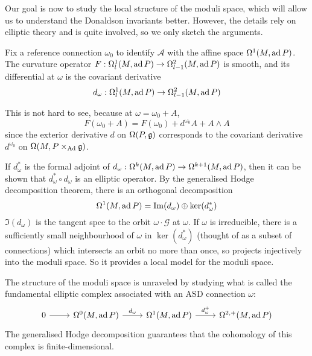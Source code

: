 \begin{comment}
The space of gauge connections $\mathcal{A}$ on a principal bundle is the
universal bundle for the group of gauge transformations $\mathcal{G}$. (ch 15
Cordes)
\end{comment}

Our goal is now to study the local structure of the moduli space, which will
allow us to understand the Donaldson invariants better. However, the details
rely on elliptic theory and is quite involved, so we only sketch the arguments.
\begin{prop}
Fix a reference connection $\omega_0$ to identify
$\mathcal{A}$ with the affine space $\Omega^1(M,\operatorname{ad} P)$. 
The curvature operator $F:\Omega^1_{l}(M,\operatorname{ad} P) \to \Omega^2_{l-1}(M,\operatorname{ad} P)$ is smooth, and
its differential at $\omega$ is the covariant derivative
\[
d_{\omega} : \Omega^1_{l}(M,\operatorname{ad} P) \to \Omega^2_{l-1}(M,\operatorname{ad} P)
\]
\end{prop}
\noindent
This is not hard to see, because at $\omega = \omega_0 + A$,
\[
F(\omega_0 + A) = F(\omega_0) + d^{\omega_0}A + A\wedge A 
\] %
since the exterior derivative $d$ on $\Omega(P,\operatorname{\mathfrak{g}})$ corresponds to the covariant
derivative $d^{\omega_0}$ on $\Omega(M,P\times_{\operatorname{Ad}}\operatorname{\mathfrak{g}})$. 

If $d^*_\omega$ is the formal adjoint of $d_\omega : \Omega^k(M,\operatorname{ad} P) \to
\Omega^{k+1}(M,\operatorname{ad} P)$, then it can be shown that $d^*_\omega \circ d_\omega$ is
an elliptic operator. By the generalised Hodge decomposition theorem,
there is an orthogonal decomposition 
 \[
\Omega^1(M,\operatorname{ad} P) = {\operatorname{Im}}(d_\omega) \oplus \ker(d^*_\omega)
\] 
$\Im(d_\omega)$ is the tangent spce to the orbit  $\omega \cdot \mathcal{G}$ at
$\omega$. 
If $\omega$ is irreducible, there is a sufficiently small neighbourhood of 
$\omega$ in  $\ker(d^*_\omega)$ (thought of as a subset of connections)
which intersects an orbit no more than once, so projects injectively into the
moduli space. So it provides a local model for the moduli space.

The structure of the moduli space is unraveled by studying what is called the
fundamental elliptic complex associated with an ASD connection $\omega$:
\[
\begin{tikzcd}
	0 \arrow[r] &\Omega^0(M,\ad P) \arrow[r,"d_\omega"] 
				&\Omega^1(M,\ad P) \arrow[r,"d^+_\omega"] &\Omega^{2,+}(M,\ad P)
\end{tikzcd} 
\]
The generalised Hodge decomposition guarantees that the cohomology of this
complex is finite-dimensional. 

